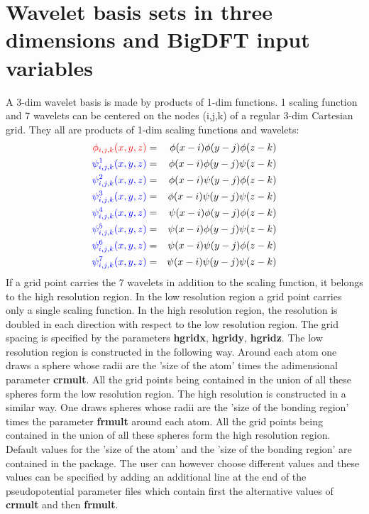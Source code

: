\documentclass[a4paper,11pt]{report}
\begin{document}
\section{Wavelet basis sets in three dimensions and BigDFT input variables}
A 3-dim wavelet basis is made by products of 1-dim functions.
 {\color{red} 1  scaling function} and {\color{blue} 7 wavelets} 
can be centered on the nodes (i,j,k) of a regular 3-dim Cartesian grid.
They all are products of 1-dim scaling functions and wavelets:
\begin{eqnarray*}
 {\color{red} \phi_{i,j,k}(x,y,z) }  & = & \phi(x-i) \phi(y-j) \phi(z-k)   \\
 {\color{blue} \psi^1_{i,j,k}(x,y,z) } & = & \phi(x-i) \phi(y-j) \psi(z-k)  \\
 {\color{blue} \psi^2_{i,j,k}(x,y,z) } & = & \phi(x-i) \psi(y-j) \phi(z-k)  \\
 {\color{blue} \psi^3_{i,j,k}(x,y,z) } & = & \phi(x-i) \psi(y-j) \psi(z-k)  \\
 {\color{blue} \psi^4_{i,j,k}(x,y,z) } & = & \psi(x-i) \phi(y-j) \phi(z-k)  \\
 {\color{blue} \psi^5_{i,j,k}(x,y,z) } & = & \psi(x-i) \phi(y-j) \psi(z-k)  \\
 {\color{blue} \psi^6_{i,j,k}(x,y,z) } & = & \psi(x-i) \psi(y-j) \phi(z-k)  \\
 {\color{blue} \psi^7_{i,j,k}(x,y,z) } & = & \psi(x-i) \psi(y-j) \psi(z-k)  \\
\end{eqnarray*}
If a grid point carries the 7 {\color{blue} wavelets} in addition to the {\color{red} scaling function}, it belongs 
to the high resolution region. In the low resolution region a grid point carries only 
a single {\color{red} scaling function}. In the high resolution region, the resolution is doubled 
in each direction with respect to the low resolution region. The grid spacing is specified by the parameters
{\bf hgridx}, {\bf hgridy}, {\bf hgridz}. The low resolution region is constructed in the following way. Around each 
atom one draws a sphere whose radii are the 'size of the atom' times the adimensional parameter {\bf crmult}. All the grid 
points being contained in the union of all these spheres form the low resolution region. The high resolution is 
constructed in a similar way. One draws spheres whose radii are the 'size of the bonding region' times the 
parameter {\bf frmult} around each atom.  All the grid points being contained in the union of all these spheres 
form the high resolution region. Default values for the 'size of the atom' and  the 'size of the bonding region' 
are contained in the package. The user can however choose different values and these values can be specified by 
adding an additional line at the end of the pseudopotential parameter files which contain first the alternative 
values of {\bf crmult} and then {\bf frmult}.
\end{document}
